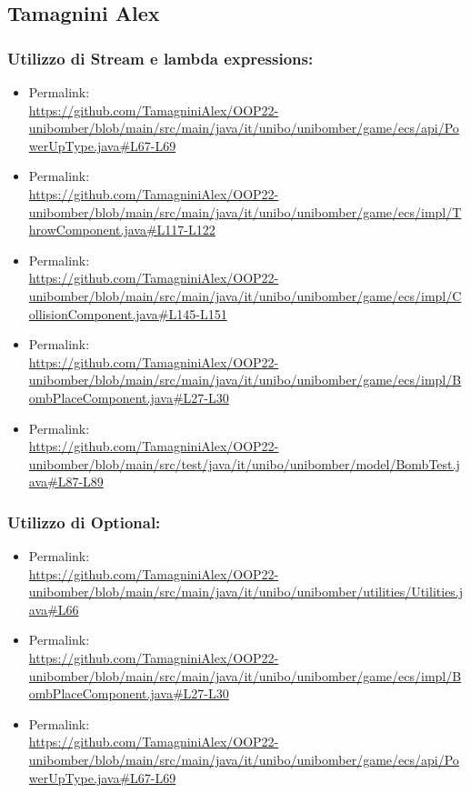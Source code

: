 \documentclass[a4paper,12pt]{report}
\begin{document}
\subsection*{Tamagnini Alex}
\subsubsection*{Utilizzo di Stream e lambda expressions:}
\begin{itemize}
    \item Permalink: 
    \\ \url{https://github.com/TamagniniAlex/OOP22-unibomber/blob/main/src/main/java/it/unibo/unibomber/game/ecs/api/PowerUpType.java#L67-L69}
    \item Permalink: 
    \\ \url{https://github.com/TamagniniAlex/OOP22-unibomber/blob/main/src/main/java/it/unibo/unibomber/game/ecs/impl/ThrowComponent.java#L117-L122}
    \item Permalink: 
    \\ \url{https://github.com/TamagniniAlex/OOP22-unibomber/blob/main/src/main/java/it/unibo/unibomber/game/ecs/impl/CollisionComponent.java#L145-L151}
    \item Permalink: 
    \\ \url{https://github.com/TamagniniAlex/OOP22-unibomber/blob/main/src/main/java/it/unibo/unibomber/game/ecs/impl/BombPlaceComponent.java#L27-L30}
    \item Permalink: 
    \\ \url{https://github.com/TamagniniAlex/OOP22-unibomber/blob/main/src/test/java/it/unibo/unibomber/model/BombTest.java#L87-L89}
\end{itemize}
\subsubsection*{Utilizzo di Optional:}
\begin{itemize}
    \item Permalink: 
    \\ \url{https://github.com/TamagniniAlex/OOP22-unibomber/blob/main/src/main/java/it/unibo/unibomber/utilities/Utilities.java#L66}
    \item Permalink: 
    \\ \url{https://github.com/TamagniniAlex/OOP22-unibomber/blob/main/src/main/java/it/unibo/unibomber/game/ecs/impl/BombPlaceComponent.java#L27-L30}
    \item Permalink: 
    \\ \url{https://github.com/TamagniniAlex/OOP22-unibomber/blob/main/src/main/java/it/unibo/unibomber/game/ecs/api/PowerUpType.java#L67-L69}
\end{itemize}
\end{document}
